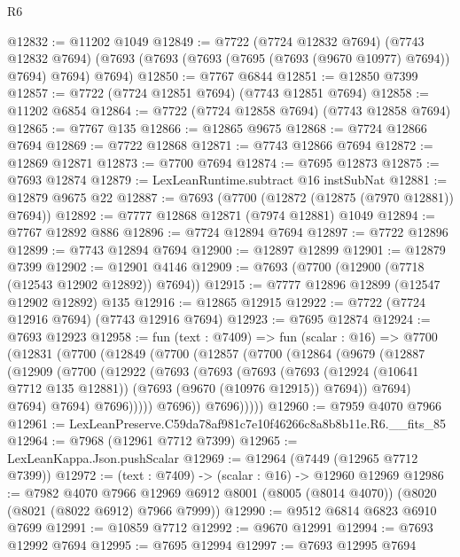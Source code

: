 \begin{lexlean}{R6}
\begin{coremodule}
@12832 := @11202 @1049
@12849 := @7722
    (@7724 @12832 @7694)
    (@7743 @12832 @7694)
    (@7693 (@7693 (@7693 (@7695 (@7693 (@9670 @10977) @7694)) @7694) @7694) @7694)
@12850 := @7767 @6844
@12851 := @12850 @7399
@12857 := @7722 (@7724 @12851 @7694) (@7743 @12851 @7694)
@12858 := @11202 @6854
@12864 := @7722 (@7724 @12858 @7694) (@7743 @12858 @7694)
@12865 := @7767 @135
@12866 := @12865 @9675
@12868 := @7724 @12866 @7694
@12869 := @7722 @12868
@12871 := @7743 @12866 @7694
@12872 := @12869 @12871
@12873 := @7700 @7694
@12874 := @7695 @12873
@12875 := @7693 @12874
@12879 := LexLeanRuntime.subtract @16 instSubNat
@12881 := @12879 @9675 @22
@12887 := @7693 (@7700 (@12872 (@12875 (@7970 @12881)) @7694))
@12892 := @7777 @12868 @12871 (@7974 @12881) @1049
@12894 := @7767 @12892 @886
@12896 := @7724 @12894 @7694
@12897 := @7722 @12896
@12899 := @7743 @12894 @7694
@12900 := @12897 @12899
@12901 := @12879 @7399
@12902 := @12901 @4146
@12909 := @7693 (@7700 (@12900 (@7718 (@12543 @12902 @12892)) @7694))
@12915 := @7777 @12896 @12899 (@12547 @12902 @12892) @135
@12916 := @12865 @12915
@12922 := @7722 (@7724 @12916 @7694) (@7743 @12916 @7694)
@12923 := @7695 @12874
@12924 := @7693 @12923
@12958 := fun (text : @7409) =>
  fun (scalar : @16) =>
  @7700
    (@12831
      (@7700
        (@12849
          (@7700
            (@12857
              (@7700
                (@12864
                  (@9679
                    (@12887
                      (@12909
                        (@7700
                          (@12922
                            (@7693
                              (@7693
                                (@7693
                                  (@7693
                                    (@12924 (@10641 @7712 @135 @12881))
                                    (@7693 (@9670 (@10976 @12915)) @7694))
                                  @7694)
                                @7694)
                              @7694)
                            @7696)))))
                  @7696))
              @7696)))))
@12960 := @7959 @4070 @7966
@12961 := LexLeanPreserve.C59da78af981c7e10f46266c8a8b8b11e.R6.__fits_85
@12964 := @7968 (@12961 @7712 @7399)
@12965 := LexLeanKappa.Json.pushScalar
@12969 := @12964 (@7449 (@12965 @7712 @7399))
@12972 := (text : @7409) -> (scalar : @16) -> @12960 @12969
@12986 := @7982
    @4070
    @7966
    @12969
    @6912
    @8001
    (@8005 (@8014 @4070))
    (@8020 (@8021 (@8022 @6912) @7966 @7999))
@12990 := @9512 @6814 @6823 @6910 @7699
@12991 := @10859 @7712
@12992 := @9670 @12991
@12994 := @7693 @12992 @7694
@12995 := @7695 @12994
@12997 := @7693 @12995 @7694

\end{coremodule}
\end{lexlean}
